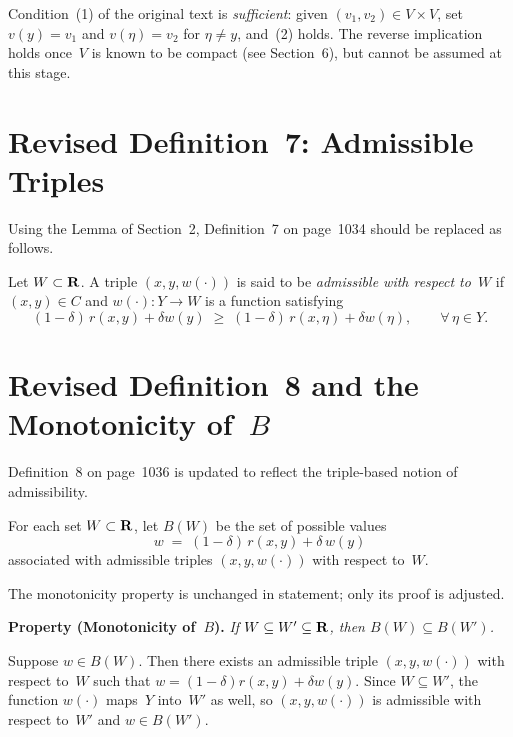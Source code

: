 \medskip
Condition~(1) of the original text is {\it sufficient\/}: given
$(v_1,v_2)\in V\times V$, set $v(y)=v_1$ and $v(\eta)=v_2$ for
$\eta\neq y$, and~(2) holds.  The reverse implication holds once~$V$
is known to be compact (see Section~6), but cannot be assumed at this
stage.

\section{Revised Definition~7: Admissible Triples}

Using the Lemma of Section~2, Definition~7 on page~1034 should be
replaced as follows.

Let $W\subset{\bf R}$.  A triple $(x,y,w(\cdot))$ is said to be
{\it admissible with respect to\/}~$W$ if $(x,y)\in C$ and
$w(\cdot):Y\to W$ is a function satisfying
$$  (1-\delta)\,r(x,y)+\delta w(y)
    \;\geq\;
    (1-\delta)\,r(x,\eta)+\delta w(\eta) ,
    \qquad \forall\,\eta\in Y .  $$
\endDefinition

\section{Revised Definition~8 and the Monotonicity of~$B$}

Definition~8 on page~1036 is updated to reflect the triple-based notion
of admissibility.

For each set $W\subset{\bf R}$, let $B(W)$ be the set of possible
values
$$  w \;=\; (1-\delta)\,r(x,y)+\delta\,w(y)  $$
associated with admissible triples $(x,y,w(\cdot))$ with respect
to~$W$.
\endDefinition

The monotonicity property is unchanged in statement; only its proof is
adjusted.

\medskip\noindent
{\bf Property (Monotonicity of~$B$).}
{\sl If $W\subseteq W'\subseteq{\bf R}$, then $B(W)\subseteq B(W')$.}

\Proof
Suppose $w\in B(W)$.  Then there exists an admissible triple
$(x,y,w(\cdot))$ with respect to~$W$ such that
$w=(1-\delta)r(x,y)+\delta w(y)$.  Since $W\subseteq W'$, the function
$w(\cdot)$ maps~$Y$ into~$W'$ as well, so $(x,y,w(\cdot))$ is
admissible with respect to~$W'$ and $w\in B(W')$.
\endProof

